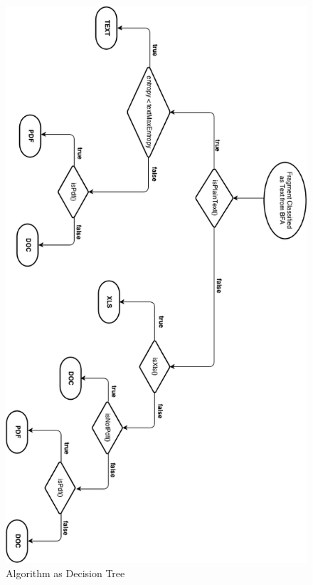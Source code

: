 \begin{figure}
\centering
 \includegraphics[scale=0.65]{figures/flowchart}
   \caption{Algorithm as Decision Tree\label{flowchart}}
\end{figure}